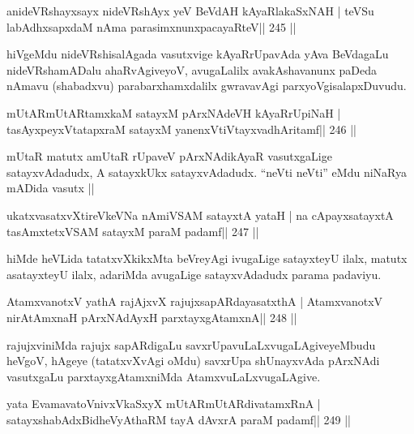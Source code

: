 \begin{shl}
anideVRshayxsayx nideVRshAyx yeV BeVdAH kAyaRlakaSxNAH |
teVSu labAdhxsapxdaM nAma parasimxnunxpacayaRteV\hfill || 245 ||
\end{shl}

\begin{artha}
hiVgeMdu nideVRshisalAgada vasutxvige kAyaRrUpavAda yAva BeVdagaLu nideVRshamADalu ahaRvAgiveyoV, avugaLalilx avakAshavanunx paDeda nAmavu (shabadxvu) parabarxhamxdalilx gwravavAgi parxyoVgisalapxDuvudu.
\end{artha}

\begin{shl}
mUtARmUtARtamxkaM satayxM pArxNAdeVH kAyaRrUpiNaH |
tasAyxpeyxVtatapxraM satayxM yanenxVtiVtayxvadhAritamf\hfill || 246 ||
\end{shl}

\begin{artha}
mUtaR matutx amUtaR rUpaveV pArxNAdikAyaR vasutxgaLige satayxvAdadudx,
A satayxkUkx satayxvAdadudx. ``neVti neVti'' eMdu niNaRya mADida vasutx
|| 
\end{artha}


\begin{shl}
ukatxvasatxvXtireVkeVNa nAmiVSAM satayxtA yataH |
na cApayxsatayxtA tasAmxtetxVSAM satayxM paraM padamf\hfill || 247 ||
\end{shl}

\begin{artha}
hiMde heVLida tatatxvXkikxMta beVreyAgi ivugaLige satayxteyU ilalx, matutx asatayxteyU ilalx, adariMda avugaLige satayxvAdadudx parama padaviyu.
\end{artha}

\begin{shl}
AtamxvanotxV yathA rajAjxvX rajujxsapARdayasatxthA |
AtamxvanotxV nirAtAmxnaH pArxNAdAyxH parxtayxgAtamxnA\hfill || 248 ||
\end{shl}

\begin{artha}
rajujxviniMda rajujx sapARdigaLu savxrUpavuLaLxvugaLAgiveyeMbudu  heVgoV, hAgeye (tatatxvXvAgi oMdu) savxrUpa shUnayxvAda pArxNAdi vasutxgaLu parxtayxgAtamxniMda AtamxvuLaLxvugaLAgive.
\end{artha}

\begin{shl}
yata EvamavatoV\s nivxVkaSxyX mUtARmUtARdivatamxRnA |
satayxshabAdxBidheVyAthaRM tayA dAvxrA paraM padamf\hfill || 249 ||
\end{shl}

